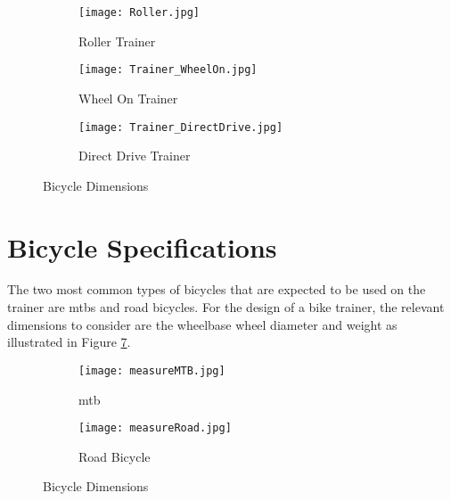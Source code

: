 \vspace{-0.5cm}

\begin{figure}[H]
	\centering
	\begin{subfigure}{.3\textwidth}
		\centering
		\texttt{[image: Roller.jpg]}
		\caption{Roller Trainer}
		\label{fig:roller}
	\end{subfigure}
	\hfill
	\begin{subfigure}{.3\textwidth}
		\centering
		\texttt{[image: Trainer\_WheelOn.jpg]}
		\caption{Wheel On Trainer}
		\label{fig:wheelon}
	\end{subfigure}
	\hfill
	\begin{subfigure}{.3\textwidth}
		\centering
		\texttt{[image: Trainer\_DirectDrive.jpg]}
		\caption{Direct Drive Trainer}
		\label{fig:directdrive}
	\end{subfigure}
	\caption{Bicycle Dimensions}
	\label{fig:trainers}
	\citep{Zwift:2022}
\end{figure}

\newpage

\section{Bicycle Specifications}
\label{sec:specs}
The two most common types of bicycles that are expected to be used on the trainer are \acp{mtb} and road bicycles. For the design of a bike trainer, the relevant dimensions to consider are the wheelbase wheel diameter and weight as illustrated in Figure \ref{fig:bikeDim}.

\begin{figure}[H]
	\centering
	\begin{subfigure}{.5\textwidth}
		\centering
		\texttt{[image: measureMTB.jpg]}
		\caption{\ac{mtb} \citep[model by:][]{Pratama:2021}}
		\label{fig:sub1}
	\end{subfigure}%
	\begin{subfigure}{.5\textwidth}
		\centering
		\texttt{[image: measureRoad.jpg]}
		\caption{Road Bicycle \citep[model by:][]{Morozev:2017}}
		\label{fig:sub2}
	\end{subfigure}
	\caption{Bicycle Dimensions}
	\label{fig:bikeDim}
\end{figure}

\vspace{-0.6 cm}


